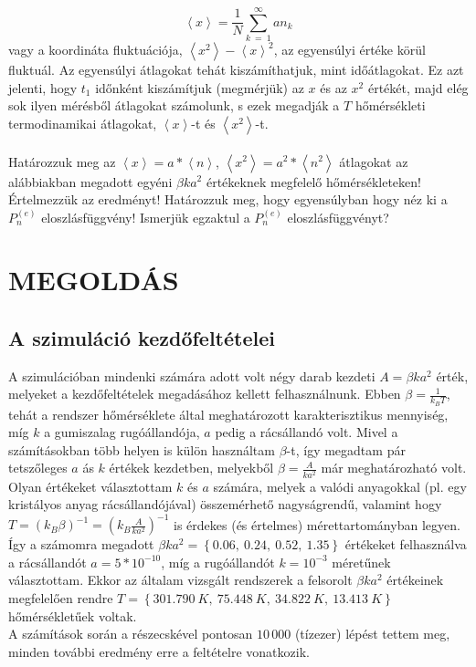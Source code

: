 \begin{equation*}
    \left< x \right>
    =
    \frac{1}{N} \sum_{k\ =\ 1}^{\infty} a n_{k}
\end{equation*}
vagy a koordináta fluktuációja, $\left< x^{2} \right> - \left< x \right>^{2}$, az egyensúlyi értéke körül fluktuál. Az egyensúlyi átlagokat tehát kiszámíthatjuk, mint időátlagokat. Ez azt jelenti, hogy $t_{1}$ időnként kiszámítjuk (megmérjük) az $x$ és az $x^{2}$ értékét, majd elég sok ilyen mérésből átlagokat számolunk, s ezek megadják a $T$ hőmérsékleti termodinamikai átlagokat, $\left< x \right>$-t és $\left< x^{2} \right>$-t.
\\ \\
Határozzuk meg az $\left< x \right> = a * \left< n \right>$, $\left< x^{2} \right> = a^{2} * \left< n^{2} \right>$ átlagokat az alábbiakban megadott egyéni $\beta k a^{2}$ értékeknek megfelelő hőmérsékleteken! Értelmezzük az eredményt! Határozzuk meg, hogy egyensúlyban hogy néz ki a $P^{(e)}_{n}$ eloszlásfüggvény! Ismerjük egzaktul a $P^{(e)}_{n}$ eloszlásfüggvényt?

\section*{\bfseries\large\MakeUppercase{Megoldás}}

\subsection*{A szimuláció kezdőfeltételei}
A szimulációban mindenki számára adott volt négy darab kezdeti $A = \beta k a^{2}$ érték, melyeket a kezdőfeltételek megadásához kellett felhasználnunk. Ebben $\beta = \frac{1}{k_{B} T}$, tehát a rendszer hőmérséklete által meghatározott karakterisztikus mennyiség, míg $k$ a gumiszalag rugóállandója, $a$ pedig a rácsállandó volt. Mivel a számításokban több helyen is külön használtam $\beta$-t, így megadtam pár tetszőleges $a$ ás $k$ értékek kezdetben, melyekből $\beta = \frac{A}{k a^{2}}$ már meghatározható volt. \\
Olyan értékeket választottam $k$ és $a$ számára, melyek a valódi anyagokkal (pl. egy kristályos anyag rácsállandójával) összemérhető nagyságrendű, valamint hogy $T = \left( k_{B} \beta \right)^{-1} = \left( k_{B} \tfrac{A}{k a^{2}} \right)^{-1}$ is érdekes (és értelmes) mérettartományban legyen. Így a számomra megadott $\beta k a^{2} = \left\{ 0.06,\ 0.24,\ 0.52,\ 1.35 \right\}$ értékeket felhasználva a rácsállandót $a = 5 * 10^{-10}$, míg a rugóállandót $k = 10^{-3}$ méretűnek választottam. Ekkor az általam vizsgált rendszerek a felsorolt $\beta k a^{2}$ értékeinek megfelelően rendre $T = \left\{ 301.790\ K,\ 75.448\ K,\ 34.822\ K,\ 13.413\ K \right\}$ hőmérsékletűek voltak. \\
A számítások során a részecskével pontosan $10\,000$ (tízezer) lépést tettem meg, minden további eredmény erre a feltételre vonatkozik.

